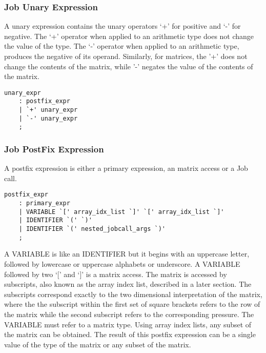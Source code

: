 \documentclass[prodmode,acmtecs]{acmsmall}
\begin{document}
\subsubsection{Job Unary Expression}
  
A unary expression contains the unary operators `+' for positive and `-' 
for negative. The `+' operator when applied to an arithmetic type does
not change the value of the type. The `-' operator when applied to an
arithmetic type, produces the negative of its operand. Similarly, for
matrices, the '+' does not change the contents of the matrix, while
'-' negates the value of the contents of the matrix.


\begin{lstlisting}
unary_expr
	: postfix_expr
	| `+' unary_expr
	| `-' unary_expr
	;
\end{lstlisting}
\medskip

\subsubsection{Job PostFix Expression}

A postfix expression is either a primary expression, an matrix access or 
a Job call.

\begin{lstlisting}
postfix_expr
	: primary_expr
	| VARIABLE `[' array_idx_list `]' `[' array_idx_list `]'
	| IDENTIFIER `(' `)'
	| IDENTIFIER `(' nested_jobcall_args `)'
	;
\end{lstlisting}
\label{Job_PostFix_Expression}

A VARIABLE is like an IDENTIFIER but it begins with an uppercase letter,
followed by lowercase or uppercase alphabets or underscore. A VARIABLE
followed by two `[' and `]' is a matrix access. The matrix is accessed
by subscripts, also known as the array index list, described in a later
section. The subscripts correspond exactly to the two dimensional 
interpretation of the matrix, where the the subscript within the first 
set of square brackets refers to the row of the matrix while the second
subscript refers to the corresponding pressure. The VARIABLE must refer 
to a matrix type. Using array index lists, any subset of the matrix can be
obtained. The result of this postfix expression can be a single value of
the type of the matrix or any subset of the matrix.
\end{document}
